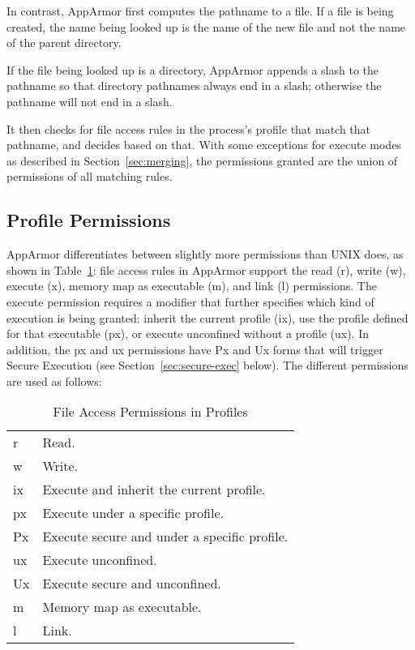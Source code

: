 \documentclass[a4paper]{article}
\begin{document}
In contrast, AppArmor first computes the pathname to a file.  If a file
is being created, the name being looked up is the name of the new file
and not the name of the parent directory.

If the file being looked up is a directory, AppArmor appends a slash to
the pathname so that directory pathnames always end in a slash;
otherwise the pathname will not end in a slash.

It then checks for file access rules in the process's profile that match
that pathname, and decides based on that.  With some exceptions for
execute modes as described in Section~\ref{sec:merging}, the permissions
granted are the union of permissions of all matching rules.


\subsection{Profile Permissions}
\label{sec:permissions}

AppArmor differentiates between slightly more permissions than UNIX
does, as shown in Table~\ref{tab:permissions}: file access rules in
AppArmor support the read (r), write (w), execute (x), memory map as
executable (m), and link (l) permissions.  The execute permission
requires a modifier that further specifies which kind of execution is
being granted: inherit the current profile (ix), use the profile defined
for that executable (px), or execute unconfined without a profile (ux).
In addition, the px and ux permissions have Px and Ux forms that will
trigger Secure Execution (see Section~\ref{sec:secure-exec} below).
The different permissions are used as follows:

\begin{table}[tb]
\center
\begin{tabular}{|l|l|}
\hline
r	& Read.							\\
w	& Write.						\\
ix	& Execute and inherit the current profile.		\\
px	& Execute under a specific profile.			\\
Px	& Execute secure and under a specific profile.		\\
ux	& Execute unconfined.					\\
Ux	& Execute secure and unconfined.			\\
m	& Memory map as executable.				\\
l	& Link.							\\
\hline
\end{tabular}
\caption{File Access Permissions in Profiles}
\label{tab:permissions}
\end{table}
\end{document}
